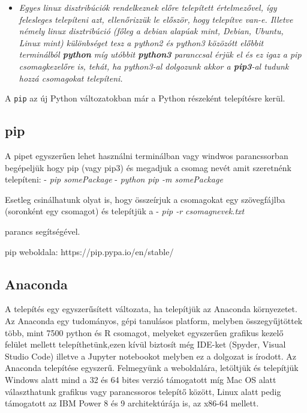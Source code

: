 \begin{itemize}
\item
  \emph{Egyes linux disztribúciók rendelkeznek előre telepített
  értelmezővel, így felesleges telepíteni azt, ellenőrizzük le először,
  hogy telepítve van-e. Illetve némely linux disztribúció (főleg a
  debian alapúak mint, Debian, Ubuntu, Linux mint) különbséget tesz a
  python2 és python3 közözótt előbbit terminálból \textbf{python} míg
  utóbbit \textbf{python3} paranccsal érjük el és ez igaz a pip
  csomagkezelőre is, tehát, ha python3-al dolgozunk akkor a
  \textbf{pip3}-al tudunk hozzá csomagokat telepíteni.}
\end{itemize}

    A \texttt{pip} az új Python változatokban már a Python részeként
telepítésre kerül.

    \subsection{pip}\label{pip}

    A pipet egyszerűen lehet használni terminálban vagy windwos
parancssorban begépeljük hogy pip (vagy pip3) és megadjuk a csomag nevét
amit szeretnénk telepíteni: - \emph{pip somePackage} - \emph{python pip
-m somePackage}

Esetleg csinálhatunk olyat is, hogy összeírjuk a csomagokat egy
szövegfájlba (soronként egy csomagot) és telepítjük a - \emph{pip -r
csomagnevek.txt}

parancs segítségével.

pip weboldala: https://pip.pypa.io/en/stable/

    \subsection{Anaconda}\label{anaconda}

    A telepítés egy egyszerűsített változata, ha telepítjük az Anaconda
környezetet. Az Anaconda egy tudományos, gépi tanulásos platform,
melyben összegyűjtöttek több, mint 7500 python és R csomagot, melyeket
egyszerűen grafikus kezelő felület mellett telepíthetünk,ezen kívül
biztosít még IDE-ket (Spyder, Visual Studio Code) illetve a Jupyter
notebookot melyben ez a dolgozat is írodott. Az Anaconda telepítése
egyszerű. Felmegyünk a weboldalára, letöltjük és telepítjük Windows
alatt mind a 32 és 64 bites verzió támogatott míg Mac OS alatt
választhatunk grafikus vagy parancssoros telepítő között, Linux alatt
pedig támogatott az IBM Power 8 és 9 architektúrája is, az x86-64
mellett.

